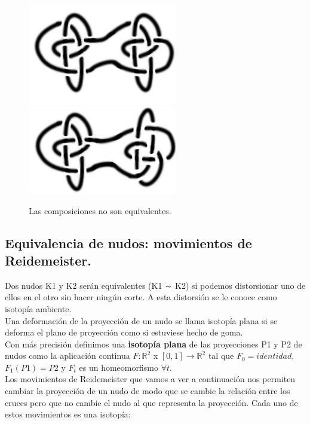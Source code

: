 \documentclass[14pt]{extarticle}
\begin{document}
         \begin{figure}[h!]
         	\includegraphics[width=6.5cm]{817def1.png}
         	\includegraphics[width=6.5cm]{817def2.png}
         	\centering
         	\caption{Las composiciones no son equivalentes.}
         	\label{comp8} 
         \end{figure}
 
    
   
\subsection{Equivalencia de nudos: movimientos de Reidemeister.}
Dos nudos K1 y K2 serán equivalentes (K1 $\thicksim$ K2) si podemos distorsionar uno de ellos en el otro sin hacer ningún corte. A esta distorsión se le conoce como isotopía ambiente. \\

Una deformación de la proyección de un nudo se llama isotopía plana si se deforma el plano de proyección como si estuviese hecho de goma.\\
Con más precisión definimos una \textbf{isotopía plana} de las proyecciones P1 y P2 de nudos como la aplicación continua $F: \mathds{R}^{2}$ x $[0,1] \rightarrow \mathds{R}^{2}$ tal que $F_{0}=identidad$, $F_{1}(P1) = P2$ y $F_{t}$ es un homeomorfismo $\forall t$.\\

Los movimientos de Reidemeister que vamos a ver a continuación nos permiten cambiar la proyección de un nudo de modo que se cambie la relación entre los cruces pero que no cambie el nudo al que representa la proyección. Cada uno de estos movimientos es una isotopía:\\
\end{document}

